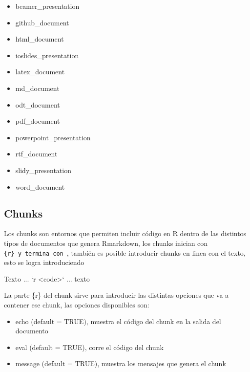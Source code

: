 \documentclass[
]{book}
\newenvironment{Shaded}{\begin{snugshade}}{\end{snugshade}}
\newcommand{\DataTypeTok}[1]{\textcolor[rgb]{0.13,0.29,0.53}{#1}}
\newcommand{\NormalTok}[1]{#1}
\newcommand{\StringTok}[1]{\textcolor[rgb]{0.31,0.60,0.02}{#1}}
\providecommand{\tightlist}{%
  \setlength{\itemsep}{0pt}\setlength{\parskip}{0pt}}
\begin{document}
\begin{itemize}
\tightlist
\item
  beamer\_presentation
\item
  github\_document
\item
  html\_document
\item
  ioslides\_presentation
\item
  latex\_document
\item
  md\_document
\item
  odt\_document
\item
  pdf\_document
\item
  powerpoint\_presentation
\item
  rtf\_document
\item
  slidy\_presentation
\item
  word\_document
\end{itemize}

\hypertarget{chunks}{%
\subsection{Chunks}\label{chunks}}

Los chunks son entornos que permiten incluir código en R dentro de las distintos tipos de documentos que genera Rmarkdown, los chunks inician con \texttt{\textasciigrave{}\textasciigrave{}\textasciigrave{}\{r\}\ y\ termina\ con\ \textasciigrave{}\textasciigrave{}\textasciigrave{}}, también es posible introducir chunks en linea con el texto, esto se logra introduciendo

\begin{Shaded}
\begin{Highlighting}[]
\NormalTok{Texto ... }\StringTok{`}\DataTypeTok{r <code>}\StringTok{`}\NormalTok{ ... texto}
\end{Highlighting}
\end{Shaded}

La parte \{r\} del chunk sirve para introducir las distintas opciones que va a contener ese chunk, las opciones disponibles son:

\begin{itemize}
\tightlist
\item
  echo (default = TRUE), muestra el código del chunk en la salida del documento
\item
  eval (default = TRUE), corre el código del chunk
\item
  message (default = TRUE), muestra los mensajes que genera el chunk
\end{itemize}
\end{document}
